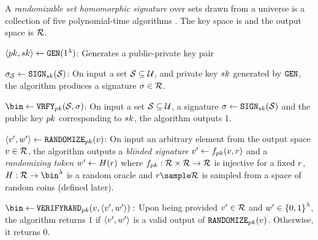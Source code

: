\begin{definition}
	A \textit{randomizable set homomorphic signature} over sets drawn from a universe \universe is a 
	collection of five polynomial-time algorithms \ourSigSchemeDefn. The key space is \sigKeySpace and the output space is $\sigOutputSpace$.
	
	\itemListStart
		\item $\keyPair \assign \keyGen(1^{\secParam})$: Generates a public-private key pair 	

		\item $\genericSig[\genericSetVar] \assign \signingAlg[\privKey](\genericSetVar)$: On input a set 
		$\genericSetVar \subseteq 
		\universe$, and private key $\privKey$ generated by $\keyGen$, the algorithm produces a 
		signature $\genericSig \in \sigOutputSpace$.
		
		
		\item $\bin \assign \verify[\pubKey](\genericSetVar, \genericSig)$:
		On input a set $\genericSetVar \subseteq
		\universe$, a signature $\genericSig \gets
		\signingAlg[\privKey](\genericSetVar)$ and the
		public key $\pubKey$ corresponding to $\privKey$,
		the algorithm outputs 1.
		
		\item $\genericSigPairAlt \assign \randomize[\pubKey](\genericSigPair[1])$: On input an arbitrary element from 
		the output space $\genericSigPair[1] \in \sigOutputSpace$, the algorithm outputs 
		a \emph{blinded signature} $\genericSigPairAlt[1] \gets \randomizeFn[\pubKey](\genericSigPair[1],\genericRand)$ 
		and a \emph{randomizing token} $\genericSigPairAlt[2] \gets \ro(\genericRand)$ 
		where $\randomizeFn[\pubKey]: \sigOutputSpace \times \genericRandSpace \rightarrow 
		\sigOutputSpace$ is injective for a fixed $\genericRand$, $\ro: \genericRandSpace \rightarrow \bin^{\secParam}$ is a random oracle and $\genericRand \getsr \genericRandSpace$ is sampled from a space of random coins (defined later). 


		
		\item $\bin \assign  \verifyRand[\pubKey](\genericSigPair[1], \genericSigPairAlt):$ Upon 
		being provided $\genericSigPairAlt[1] \in \sigOutputSpace$ and $\genericSigPairAlt[2] \in 
		\setDefn{0,1}^{\secParam}$, the algorithm returns 1 if $\genericSigPairAlt$ is a valid output of 
		$\randomize[\pubKey](\genericSigPair[1])$. Otherwise, it returns 0. 
		

\end{definition}
